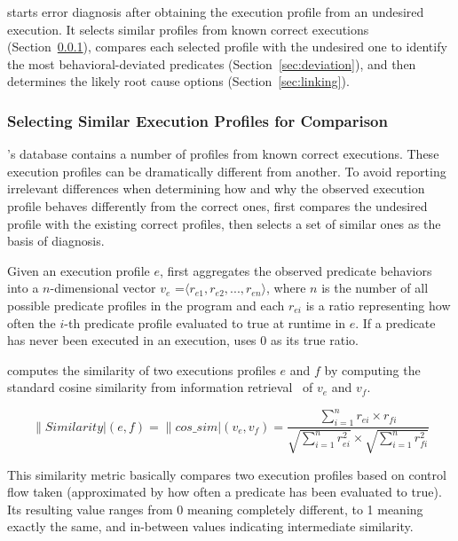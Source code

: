 \ourtool starts error diagnosis after obtaining the execution profile from
an undesired execution. It selects similar
profiles from known correct executions (Section~\ref{sec:similar}), compares
each selected profile with
the undesired one to identify the most behavioral-deviated predicates
(Section~\ref{sec:deviation}), and then determines
the likely root cause options (Section~\ref{sec:linking}).


\subsubsection{Selecting Similar Execution Profiles for Comparison}
\label{sec:similar}

\ourtool's database contains a number of
profiles from known correct executions.  These execution profiles 
can be dramatically different from another.  To avoid reporting irrelevant
differences when 
determining how and why the observed execution profile behaves
differently from the correct ones, \ourtool first
compares the undesired profile with the existing
correct profiles, then selects a set of similar ones
as the basis of diagnosis.

Given an execution profile $e$, \ourtool first aggregates
the observed predicate behaviors into a $n$-dimensional
vector $v_e$ =$\langle r_{e1}, r_{e2}, ..., r_{en}\rangle$, where $n$
is the number of all possible predicate profiles in the program
and each $r_{ei}$ is a ratio representing how often the $i$-th predicate
profile evaluated to true at runtime in $e$.
If a predicate has never been executed in an execution,
\ourtool uses 0 as its true ratio. %

\ourtool computes the similarity of two executions profiles $e$ and $f$
by computing the standard cosine similarity from information retrieval~\cite{Witten96managinggigabytes}
of $v_{e}$ and $v_{f}$.

\vspace{-2mm}

{\small{
\[
\|Similarity|(e, f) = \|cos\_sim|(v_{e}, v_{f}) = \frac{\sum_{i = 1}^{n}r_{ei} \times r_{fi}}
{\sqrt{\sum_{i = 1}^{n}r_{ei}^2} \times \sqrt{\sum_{i = 1}^{n}r_{fi}^2}}
\]
}}

\vspace{-2mm}

This similarity metric basically compares two execution profiles based on
 control flow taken (approximated by how often a predicate has been evaluated to
true). Its resulting value ranges from 0 meaning completely different, to 1 meaning exactly the same, 
and in-between values indicating intermediate similarity.


